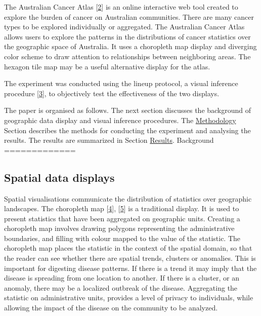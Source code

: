 \documentclass[conference,final,]{IEEEtran}
\begin{document}
The Australian Cancer Atlas {[}\protect\hyperlink{ref-atlas}{2}{]} is an online interactive web tool created to explore the burden of cancer on Australian communities. There are many cancer types to be explored individually or aggregated. The Australian Cancer Atlas allows users to explore the patterns in the distributions of cancer statistics over the geographic space of Australia. It uses a choropleth map display and diverging color scheme to draw attention to relationships between neighboring areas. The hexagon tile map may be a useful alternative display for the atlas.

The experiment was conducted using the lineup protocol, a visual inference procedure {[}\protect\hyperlink{ref-GIIV}{3}{]}, to objectively test the effectiveness of the two displays.

The paper is organised as follows. The next section discusses the background of geographic data display and visual inference procedures. The \protect\hyperlink{methodology}{Methodology} Section describes the methods for conducting the experiment and analysing the results. The results are summarized in Section \protect\hyperlink{results}{Results}.
Background
=============

\hypertarget{spatial-data-displays}{%
\subsection{Spatial data displays}\label{spatial-data-displays}}

Spatial visualisations communicate the distribution of statistics over geographic landscapes. The choropleth map {[}\protect\hyperlink{ref-EI}{4}{]}, {[}\protect\hyperlink{ref-BCM}{5}{]} is a traditional display. It is used to present statistics that have been aggregated on geographic units. Creating a choropleth map involves drawing polygons representing the administrative boundaries, and filling with colour mapped to the value of the statistic. The choropleth map places the statistic in the context of the spatial domain, so that the reader can see whether there are spatial trends, clusters or anomalies. This is important for digesting disease patterns. If there is a trend it may imply that the disease is spreading from one location to another. If there is a cluster, or an anomaly, there may be a localized outbreak of the disease. Aggregating the statistic on administrative units, provides a level of privacy to individuals, while allowing the impact of the disease on the community to be analyzed.
\end{document}
